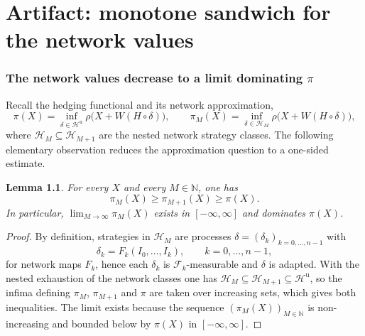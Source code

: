 \documentclass[11pt,a4paper]{report}
\numberwithin{equation}{chapter}
\theoremstyle{plain}
\newtheorem{lemma}[proposition]{Lemma}
\theoremstyle{definition}
\newcommand{\N}{\mathbb{N}}
\newcommand{\F}{\mathcal{F}}
\newcommand{\HH}{\mathcal{H}}
\newcommand{\Hu}{\mathcal{H}^{\mathrm{u}}}
\begin{document}
\setcounter{chapter}{3}

\chapter{Artifact: monotone sandwich for the network values}

\subsection*{The network values decrease to a limit dominating $\pi$}

Recall the hedging functional and its network approximation,
\[
  \pi(X)=\inf_{\delta\in\Hu}\rho\bigl(X+W(H\circ\delta)\bigr),
  \qquad
  \pi_M(X)=\inf_{\delta\in\HH_M}\rho\bigl(X+W(H\circ\delta)\bigr),
\]
where $\HH_M\subseteq\HH_{M+1}$ are the nested network strategy classes.
The following elementary observation reduces the approximation question
to a one-sided estimate.

\begin{lemma}\label{lem:monotone}
  For every $X$ and every $M\in\N$, one has
  \[
    \pi_M(X)\ge\pi_{M+1}(X)\ge\pi(X).
  \]
  In particular, $\lim_{M\to\infty}\pi_M(X)$ exists in $[-\infty,\infty]$
  and dominates $\pi(X)$.
\end{lemma}

\begin{proof}
  By definition, strategies in $\HH_M$ are processes
  $\delta=(\delta_k)_{k=0,\dots,n-1}$ with
  \[
    \delta_k=F_k(I_0,\dots,I_k),\qquad k=0,\dots,n-1,
  \]
  for network maps $F_k$, hence each $\delta_k$ is $\F_k$-measurable and
  $\delta$ is adapted. With the nested exhaustion of the network classes
  one has $\HH_M\subseteq\HH_{M+1}\subseteq\Hu$, so the infima defining
  $\pi_M$, $\pi_{M+1}$ and $\pi$ are taken over increasing sets, which
  gives both inequalities. The limit exists because the sequence
  $(\pi_M(X))_{M\in\N}$ is non-increasing and bounded below by $\pi(X)$
  in $[-\infty,\infty]$.
\end{proof}
\end{document}
